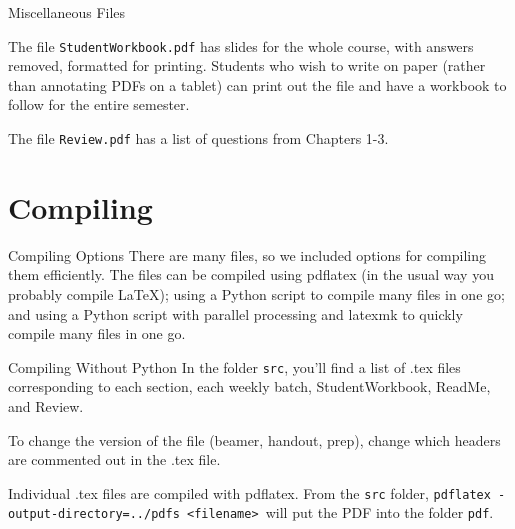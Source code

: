 \documentclass[10pt]{beamer}
\begin{document}
\begin{frame}{Miscellaneous Files}

The file \texttt{StudentWorkbook.pdf} has slides for the whole course, with answers removed, formatted for printing. Students who wish to write on paper (rather than annotating PDFs on a tablet) can print out the file and have a workbook to follow for the entire semester.\vfill

The file \texttt{Review.pdf} has a list of questions from Chapters 1-3.
\vfill

\end{frame}
\section{Compiling}
\frame{\tableofcontents[currentsection]}
\begin{frame}{Compiling Options}
There are many files, so we included options for compiling them efficiently. The files can be compiled using pdflatex (in the usual way you probably compile LaTeX); using a Python script to compile many files in one go; and using a Python script with parallel processing and latexmk to quickly compile many files in one go.
\end{frame}
\begin{frame}{Compiling Without Python}
In the folder \texttt{src}, you'll find a list of .tex files corresponding to each section, each weekly batch, StudentWorkbook, ReadMe, and Review. 
\vfill

To change the version of the file (beamer, handout, prep), change which headers are commented out in the .tex file.

\vfill

Individual .tex files are compiled with pdflatex. From the \texttt{src} folder, \texttt{pdflatex -output-directory=../pdfs  <filename> }will put the PDF into the folder \texttt{pdf}.
\end{frame}
\end{document}
